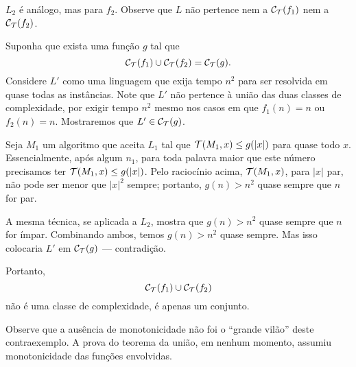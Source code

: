 \begin{counterexample}
    $L_2$ é análogo, mas para $f_2$.
    Observe que $L$ não pertence nem a $\mathcal C_{\mathcal{T}}(f_1)$
    nem a $\mathcal C_{\mathcal{T}}(f_2)$.

    Suponha que exista uma função $g$ tal que
    \begin{equation*}
        \mathcal C_{\mathcal{T}}(f_1) \cup \mathcal C_{\mathcal{T}}(f_2) =
        \mathcal C_{\mathcal{T}}(g).
    \end{equation*}
    Considere $L'$ como uma linguagem que exija tempo $n^2$
    para ser resolvida em quase todas as instâncias.
    Note que $L'$ não pertence à união das duas classes de complexidade,
    por exigir tempo $n^2$ mesmo nos casos em que
    $f_1(n) = n$ ou $f_2(n) = n$.
    Mostraremos que $L' \in \mathcal C_{\mathcal{T}}(g)$.

    Seja $M_1$ um algoritmo que aceita $L_1$
    tal que ${\mathcal{T}}(M_1, x) \leq g(|x|)$
    para quase todo $x$.
    Essencialmente,
    após algum $n_1$,
    para toda palavra maior que este número
    precisamos ter ${\mathcal{T}}(M_1, x) \leq g(|x|)$.
    Pelo raciocínio acima,
    ${\mathcal{T}}(M_1, x)$,
    para $|x|$ par,
    não pode ser menor que $|x|^2$ sempre;
    portanto, $g(n) > n^2$ quase sempre
    que $n$ for par.

    A mesma técnica,
    se aplicada a $L_2$,
    mostra que
    $g(n) > n^2$ quase sempre que $n$ for ímpar.
    Combinando ambos,
    temos $g(n) > n^2$ quase sempre.
    Mas isso colocaria $L'$ em $\mathcal C_{\mathcal{T}}(g)$
    --- contradição.

    Portanto,
    \begin{equation*}
        \mathcal C_{\mathcal{T}}(f_1) \cup \mathcal C_{\mathcal{T}}(f_2)
    \end{equation*}
    não é uma classe de complexidade,
    é apenas um conjunto.
\end{counterexample}

Observe que a ausência de monotonicidade
não foi o ``grande vilão''
deste contraexemplo.
A prova do teorema da união,
em nenhum momento,
assumiu monotonicidade das funções envolvidas.
